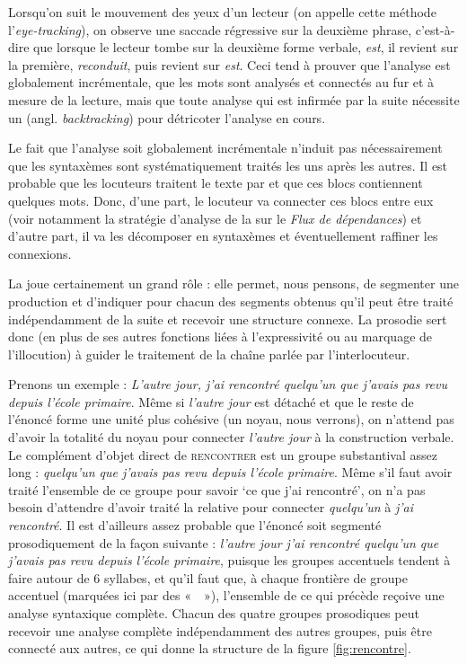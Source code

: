 {    Lorsqu’on suit le mouvement des yeux d’un lecteur (on appelle cette méthode l’\textit{eye-tracking}), on observe une saccade régressive sur la deuxième phrase, c’est-à-dire que lorsque le lecteur tombe sur la deuxième forme verbale, \textit{est}, il revient sur la première, \textit{reconduit}, puis revient sur \textit{est}. Ceci tend à prouver que l’analyse est globalement incrémentale, que les mots sont analysés et connectés au fur et à mesure de la lecture, mais que toute analyse qui est infirmée par la suite nécessite un  (angl. \textit{backtracking}) pour détricoter l’analyse en cours.

    Le fait que l’analyse soit globalement incrémentale n’induit pas nécessairement que les syntaxèmes sont systématiquement traités les uns après les autres. Il est probable que les locuteurs traitent le texte par  et que ces blocs contiennent quelques mots. Donc, d’une part, le locuteur va connecter ces blocs entre eux (voir notamment la stratégie d’analyse de la  sur le \textit{Flux de dépendances}) et d’autre part, il va les décomposer en syntaxèmes et éventuellement raffiner les connexions.

    La  joue certainement un grand rôle : elle permet, nous pensons, de segmenter une production et d’indiquer pour chacun des segments obtenus qu’il peut être traité indépendamment de la suite et recevoir une structure connexe. La prosodie sert donc (en plus de ses autres fonctions liées à l’expressivité ou au marquage de l’illocution) à guider le traitement de la chaîne parlée par l’interlocuteur.

    Prenons un exemple : \textit{L’autre jour, j’ai rencontré quelqu’un que j’avais pas revu depuis l’école primaire}. Même si \textit{l’autre jour} est détaché et que le reste de l’énoncé forme une unité plus cohésive (un noyau, nous verrons), on n’attend pas d’avoir la totalité du noyau pour connecter \textit{l’autre jour} à la construction verbale. Le complément d’objet direct de \textsc{rencontrer} est un groupe substantival assez long : \textit{quelqu’un que j’avais pas revu depuis l’école primaire}. Même s’il faut avoir traité l’ensemble de ce groupe pour savoir ‘ce que j’ai rencontré’, on n’a pas besoin d’attendre d’avoir traité la relative pour connecter \textit{quelqu’un} à \textit{j’ai rencontré}. Il est d’ailleurs assez probable que l’énoncé soit segmenté prosodiquement de la façon suivante : \textit{l’autre jour {\textbar} j’ai rencontré quelqu’un {\textbar} que j’avais pas revu {\textbar} depuis l’école primaire}, puisque les groupes accentuels tendent à faire autour de 6 syllabes, et qu’il faut que, à chaque frontière de groupe accentuel (marquées ici par des «~\textit{{\textbar}}~»), l’ensemble de ce qui précède reçoive une analyse syntaxique complète. Chacun des quatre groupes prosodiques peut recevoir une analyse complète indépendamment des autres groupes, puis être connecté aux autres, ce qui donne la structure de la figure \ref{fig:rencontre}.

}
